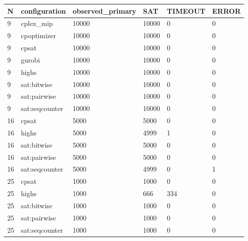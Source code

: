 \begin{tabular}{llllll}
\hline
N & configuration & observed\_primary & SAT & TIMEOUT & ERROR \\
\hline
9 & cplex\_mip & 10000 & 10000 & 0 & 0 \\
9 & cpoptimizer & 10000 & 10000 & 0 & 0 \\
9 & cpsat & 10000 & 10000 & 0 & 0 \\
9 & gurobi & 10000 & 10000 & 0 & 0 \\
9 & highs & 10000 & 10000 & 0 & 0 \\
9 & sat:bitwise & 10000 & 10000 & 0 & 0 \\
9 & sat:pairwise & 10000 & 10000 & 0 & 0 \\
9 & sat:seqcounter & 10000 & 10000 & 0 & 0 \\
16 & cpsat & 5000 & 5000 & 0 & 0 \\
16 & highs & 5000 & 4999 & 1 & 0 \\
16 & sat:bitwise & 5000 & 5000 & 0 & 0 \\
16 & sat:pairwise & 5000 & 5000 & 0 & 0 \\
16 & sat:seqcounter & 5000 & 4999 & 0 & 1 \\
25 & cpsat & 1000 & 1000 & 0 & 0 \\
25 & highs & 1000 & 666 & 334 & 0 \\
25 & sat:bitwise & 1000 & 1000 & 0 & 0 \\
25 & sat:pairwise & 1000 & 1000 & 0 & 0 \\
25 & sat:seqcounter & 1000 & 1000 & 0 & 0 \\
\hline
\end{tabular}
